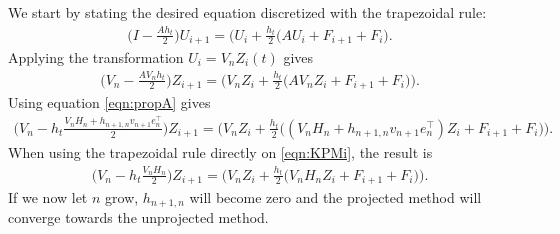 \noindent We start by stating the desired equation discretized with the trapezoidal rule:
\begin{equation*}
\begin{aligned}
\Big(I-\frac{Ah_t}{2} \Big) U_{i+1} = \Big( U_i + \frac{h_t}{2} \big( A U_i + F_{i+1} +F_{i} \big) \Big.
\end{aligned}
\end{equation*}
Applying the transformation $ U_i = V_n Z_i(t) $ gives
\begin{equation*}
\begin{aligned}
\Big(V_n-\frac{A V_n h_t}{2}\Big) Z_{i+1} = \Big( V_n Z_i + \frac{h_t}{2} \big( A V_n Z_i + F_{i+1} +F_{i} \big) \Big).
\end{aligned}
\end{equation*}
Using equation \eqref{eqn:propA} gives
\begin{equation*}
\begin{aligned}
\Big(V_n-h_t\frac{V_n H_n + h_{n+1,n}v_{n+1} e_n^\top }{2}\Big) Z_{i+1} = \Big( V_n Z_i + \frac{h_t}{2} \big( (V_n H_n + h_{n+1,n}v_{n+1} e_n^\top) Z_i + F_{i+1} +F_{i} \big) \Big).
\end{aligned}
\end{equation*}
When using the trapezoidal rule directly on \eqref{eqn:KPMi}, the result is
\begin{equation*}
\begin{aligned}
\Big(V_n-h_t\frac{V_n H_n}{2}\Big) Z_{i+1} = \Big( V_n Z_i + \frac{h_t}{2} \big( V_n H_n Z_i + F_{i+1} +F_{i} \big) \Big).
\end{aligned}
\end{equation*}
If we now let $n$ grow, $h_{n+1,n}$ will become zero and the projected method will converge towards the unprojected method. 
